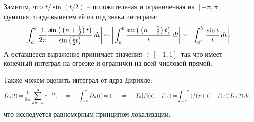 \begin{uproof}
    Заметим, что $t/\sin(t/2)$ -- положительная и ограниченная на $[-\pi, \pi]$ функция, тогда вынесем её из под знака интеграла:
    \begin{equation*}
        \bigg| \int_{a}^{b} \frac{1}{2\pi} \frac{\sin \big(\left(n+\frac{1}{2}\right) t\big)}{\sin\left(\frac{1}{2} t\right)} \, d t \bigg| \sim
        \bigg|
           \int_a^b \frac{\sin \big(\left(n+\frac{1}{2}\right) t\big)}{t} \, d t 
        \bigg| \sim 
        \bigg|
            \int_{a'}^{b'}  \frac{\sin t}{t} \, d t
        \bigg|.
    \end{equation*}
    А оставшееся выражение принимает значения $\in [-1, 1]$, так что имеет конечный интеграл на отрезке и ограничен на всей числовой прямой.
\end{uproof}

Также можем оценить интеграл от ядра Дирихле:
\begin{equation*}
    D_n (t) = \frac{1}{2\pi} \sum_{k=-n}^{n} e^{-ikt},
    \hspace{0.5cm} \Rightarrow \hspace{0.5cm}
    \int_{-\pi}^{\pi} D_n (t) = 1,
    \hspace{0.5cm} \Rightarrow \hspace{0.5cm}
    T_n[f](x) - f(x) = \int_{-\pi}^{+\pi} \left(
        f(x+t) -f(x)
    \right) D_n(t) \, d t,
\end{equation*}
что исследуется равномерным принципом локализации.